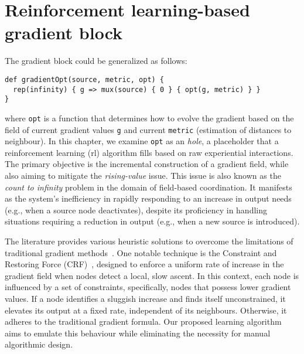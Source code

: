 \section{Reinforcement learning-based gradient block}
The gradient block could be generalized as follows:
\begin{lstlisting}
def gradientOpt(source, metric, opt) {
  rep(infinity) { g => mux(source) { 0 } { opt(g, metric) } }
}
\end{lstlisting}
where \lstinline|opt| is a function that determines how to evolve the gradient based on the field of current gradient values \lstinline|g| and current \lstinline|metric| (estimation of distances to neighbour). 
In this chapter, we examine \lstinline|opt| as an \emph{hole}, 
 a placeholder that a reinforcement learning (\ac{rl}) algorithm fills based on raw experiential interactions. 
 The primary objective is the incremental construction of a gradient field, while also aiming to mitigate the \emph{rising-value} issue. 
 This issue is also known as the \emph{count to infinity} problem in the domain of field-based coordination. 
 It manifests as the system's inefficiency in rapidly responding to an increase in output needs (e.g., when a source node deactivates), 
 despite its proficiency in handling situations requiring a reduction in output (e.g., when a new source is introduced).

The literature provides various heuristic solutions to overcome the limitations of traditional gradient methods~\cite{DBLP:conf/saso/AudritoCDV17}. 
 One notable technique is the Constraint and Restoring Force (CRF)~\cite{DBLP:conf/sac/BealBVT08}, 
 designed to enforce a uniform rate of increase in the gradient field when nodes detect a local, slow ascent. 
 In this context, each node is influenced by a set of constraints, specifically, nodes that possess lower gradient values. 
 If a node identifies a sluggish increase and finds itself unconstrained, it elevates its output at a fixed rate, independent of its neighbours. 
 Otherwise, it adheres to the traditional gradient formula. 
 Our proposed learning algorithm aims to emulate this behaviour while eliminating the necessity for manual algorithmic design.


